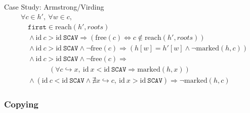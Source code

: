\documentclass[usenames,dvipsnames]{beamer}
\renewcommand{\iff}{\Leftrightarrow}
\renewcommand{\implies}{\Rightarrow}
\newcommand{\pointsto}{\hookrightarrow}
\newcommand{\reach}[2]{\mathrm{reach}\left(#1, #2\right)}
\newcommand{\id}{\mathrm{id}}
\newcommand{\free}[1]{\mathrm{free}\left(#1\right)}
\newcommand{\marked}[2]{\mathrm{marked}\left(#1, #2\right)}
\begin{document}
\begin{frame}[fragile]{Case Study: Armstrong/Virding}
  \begin{align*}
    &\forall c \in h',\ \forall w \in c,\\
    &\quad\mathtt{first} \in\reach{h'}{roots}\\
%
    &\quad\land \id~c > \id~\mathtt{SCAV} \implies (\free{c}
      \iff c \notin \reach{h'}{roots})\\
%
    &\quad\land \id~c > \id~\mathtt{SCAV} \land \lnot\free{c}
      \implies (h[w] = h'[w] \land \lnot \marked{h}{c})\\
%
    &\quad\land \id~c > \id~\mathtt{SCAV} \land \lnot\free{c}
      \implies\\
      &\quad\quad\quad\quad(\forall c \pointsto x,\ \id~x <
      \id~\mathtt{SCAV} \implies \marked{h}{x})\\
%
    &\quad\land \left(\id~c < \id~\mathtt{SCAV} \land \nexists x \pointsto
      c,\ \id~x > \id~\mathtt{SCAV}\right) \implies \lnot\marked{h}{c}
  \end{align*}

\end{frame}

\subsubsection{Copying}
\end{document}
